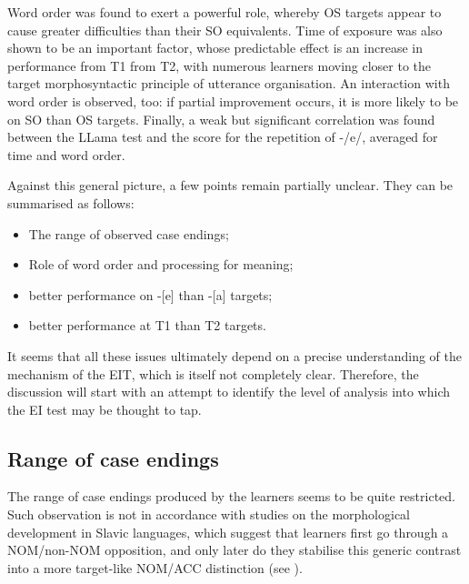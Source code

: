 Word order was found to exert a powerful role, whereby OS targets appear to cause greater difficulties than their SO equivalents. Time of exposure was also shown to be an important factor, whose predictable effect is an increase in performance from T1 from T2, with numerous learners moving closer to the target morphosyntactic principle of utterance organisation. An interaction with word order is observed, too: if partial improvement occurs, it is more likely to be on SO than OS targets. Finally, a weak but significant correlation was found between the LLama test and the score for the repetition of -/e/, averaged for time and word order.

Against this general picture, a few points remain partially unclear. They can be summarised as follows:

\begin{itemize}
    \item The range of observed case endings;
    \item Role of word order and processing for meaning;
    \item better performance on -[e] than -[a] targets;
    \item better performance at T1 than T2 targets.
\end{itemize}

It seems that all these issues ultimately depend on a precise understanding of the mechanism of the EIT, which is itself not completely clear. Therefore, the discussion will start with an attempt to identify the level of analysis into which the EI test may be thought to tap. 

\subsection{Range of case endings}\label{sec:08:2.1}

The range of case endings produced by the learners seems to be quite restricted. Such observation is not in accordance with studies on the morphological development in Slavic languages, which suggest that learners first go through a NOM/non-NOM opposition, and only later do they stabilise this generic contrast into a more target-like NOM/ACC distinction (see ).

